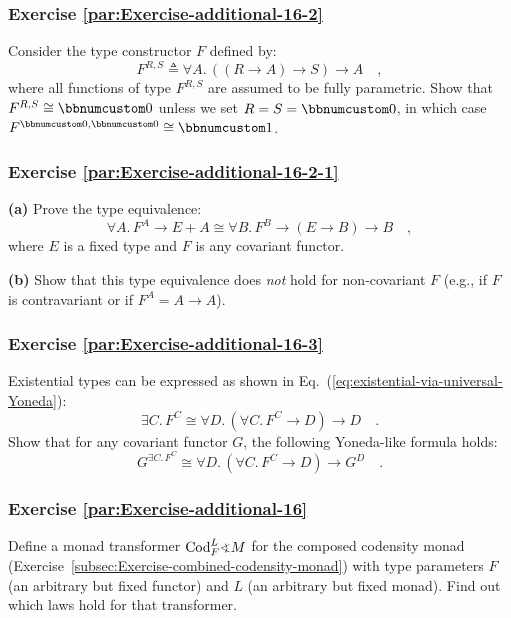\subsubsection{Exercise \label{par:Exercise-additional-16-2}\ref{par:Exercise-additional-16-2}}

Consider the type constructor $F$ defined by:
\[
F^{R,S}\triangleq\forall A.\,((R\rightarrow A)\rightarrow S)\rightarrow A\quad,
\]
where all functions of type $F^{R,S}$ are assumed to be fully parametric.
Show that $F^{R,S}\cong\bbnum 0$ unless we set $R=S=\bbnum 0$, in
which case $F^{\bbnum 0,\bbnum 0}\cong\bbnum 1$. 

\subsubsection{Exercise \label{par:Exercise-additional-16-2-1}\ref{par:Exercise-additional-16-2-1}}

\textbf{(a)} Prove the type equivalence:
\[
\forall A.\,F^{A}\rightarrow E+A\cong\forall B.\,F^{B}\rightarrow(E\rightarrow B)\rightarrow B\quad,
\]
where $E$ is a fixed type and $F$ is any covariant functor.

\textbf{(b)} Show that this type equivalence does \emph{not} hold
for non-covariant $F$ (e.g., if $F$ is contravariant or if $F^{A}=A\rightarrow A$).

\subsubsection{Exercise \label{par:Exercise-additional-16-3}\ref{par:Exercise-additional-16-3}}

Existential types can be expressed as shown in Eq.~(\ref{eq:existential-via-universal-Yoneda}):
\[
\exists C.\,F^{C}\cong\forall D.\,(\forall C.\,F^{C}\rightarrow D)\rightarrow D\quad.
\]
Show that for any covariant functor $G$, the following Yoneda-like
formula holds:
\[
G^{\exists C.\,F^{C}}\cong\forall D.\,(\forall C.\,F^{C}\rightarrow D)\rightarrow G^{D}\quad.
\]


\subsubsection{Exercise \label{par:Exercise-additional-16}\ref{par:Exercise-additional-16}}

Define a monad transformer $\text{Cod}_{F}^{L}\varangle M$ for the
composed codensity monad (Exercise~\ref{subsec:Exercise-combined-codensity-monad})
with type parameters $F$ (an arbitrary but fixed functor) and $L$
(an arbitrary but fixed monad). Find out which laws hold for that
transformer.

